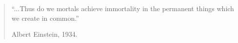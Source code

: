 \documentclass[letterpaper,11pt]{report}
\begin{document}
\bigskip
\bigskip
\bigskip




\begin{quote}
    ``...Thus do we mortals achieve immortality in the permanent things which we create in common.''

    \hfill Albert Einstein, 1934.
\end{quote}
\newpage

\tableofcontents
{}
\setcounter{page}{1}











\appendix





\end{document}
